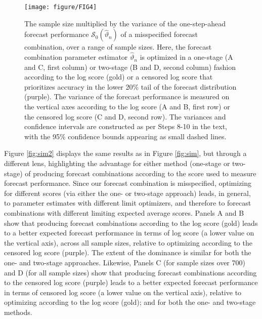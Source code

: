 \documentclass[12pt]{article}
\theoremstyle{definition}
\theoremstyle{remark}
\begin{document}
\begin{figure*}[t]
\texttt{[image: figure/FIG4]}
\caption{The sample size multiplied by the variance of the one-step-ahead forecast performance $\mathcal{S}_0(\hat{\vartheta}_n)$ of a misspecified forecast combination, over a range of sample sizes. Here, the forecast combination parameter estimator $\hat{\vartheta}_n$ is optimized in a one-stage (A and C, first column) or two-stage (B and D, second column) fashion according to the log score (gold) or a censored log score that prioritizes accuracy in the lower 20\% tail of the forecast distribution (purple). The variance of the forecast performance is measured on the vertical axes according to the log score (A and B, first row) or the censored log score (C and D, second row). The variances and confidence intervals are constructed as per Steps 8-10 in the text, with the 95\% confidence bounds appearing as small dashed lines.}
\label{fig:sim4}
\end{figure*}

Figure \ref{fig:sim2} displays the same results as in Figure \ref{fig:sim}, but through a different lens, highlighting the advantage for either method (one-stage or two-stage) of producing forecast combinations according to the score used to measure forecast performance. Since our forecast combination is misspecified, optimizing for different scores (via either the one- or two-stage approach) leads, in general, to parameter estimates with different limit optimizers, and therefore to forecast combinations with different limiting expected average scores. Panels A and B show that producing forecast combinations according to the log score (gold) leads to a better expected forecast performance in terms of log score (a lower value on the vertical axis), across all sample sizes, relative to optimizing according to the censored log score (purple). The extent of the dominance is similar for both the one- and two-stage approaches. Likewise, Panels C (for sample sizes over 700) and D (for all sample sizes) show that producing forecast combinations according to the censored log score (purple) leads to a better expected forecast performance in terms of censored log score (a lower value on the vertical axis), relative to optimizing according to the log score (gold); and for both the one- and two-stage methods.
\end{document}
